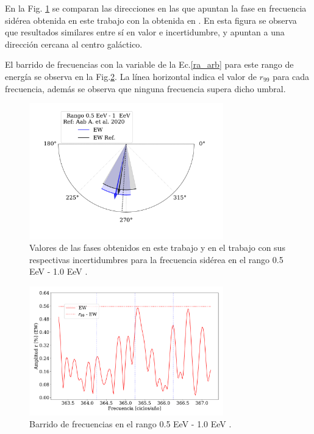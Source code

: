     En la Fig. \ref{fig:segundo} se comparan las direcciones en las que apuntan la fase en frecuencia sidérea obtenida en este trabajo con la obtenida en \cite{Aab_2020}. En esta figura se observa que resultados similares entre sí en valor e incertidumbre, y apuntan a una dirección cercana al centro galáctico.

    El barrido de frecuencias con la variable de la Ec.\ref{ra_arb} para este rango de energía se observa en la Fig.\ref{fig:segundo_barrido}. La línea horizontal indica el valor de $r_{99}$ para cada frecuencia, además se observa que ninguna frecuencia supera dicho umbral. 
    
    \begin{figure}[H]
        \begin{small}
            \begin{center}
                \includegraphics[width=0.75\textwidth]{phase_segundo_bin_v2.pdf}
            \end{center}
            \caption{Valores de las fases obtenidos en este trabajo y en el trabajo \cite{Aab_2020} con sus respectivas incertidumbres para la frecuencia sidérea en el rango 0.5 EeV - 1.0 EeV .}
            \label{fig:segundo}
        \end{small}
    \end{figure}


    \begin{figure}[H]
        \begin{small}
            \begin{center}
                \includegraphics[width=0.75\textwidth]{plot_bin_2_barrido_v3_EW.pdf}
            \end{center}
            \caption{Barrido de frecuencias en el  rango 0.5 EeV - 1.0 EeV .}
            \label{fig:segundo_barrido}
        \end{small}
    \end{figure}    


